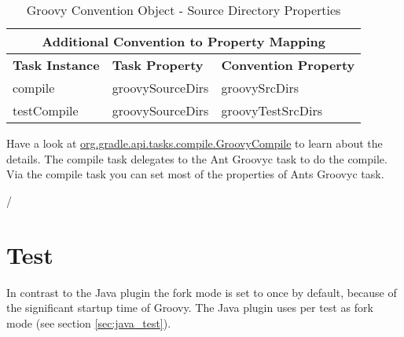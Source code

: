 \begin{table}
\begin{center}
	\begin{tabular}{|l|l|l|} \hline
		\multicolumn{3}{|c|}{Additional Convention to Property Mapping} \\ \hline
		\textbf{Task Instance} & \textbf{Task Property} & \textbf{Convention Property} \\ \hline
		compile & groovySourceDirs & groovySrcDirs \\ \hline
		testCompile & groovySourceDirs & groovyTestSrcDirs \\ \hline
	\end{tabular} 
\end{center}
\caption{Groovy Convention Object - Source Directory Properties}
\end{table}

Have a look at \href{\API tasks/compile/GroovyCompile.html}{org.gradle.api.tasks.compile.GroovyCompile} to learn about the details. The compile task delegates to the Ant Groovyc task to do the compile. Via the compile task you can set most of the properties of Ants Groovyc task. 

/\section{Test} %
\label{sec:test}
In contrast to the Java plugin the fork mode is set to once by default, because of the significant startup time of Groovy. The Java plugin uses per test as fork mode (see section \ref{sec:java_test}). 

